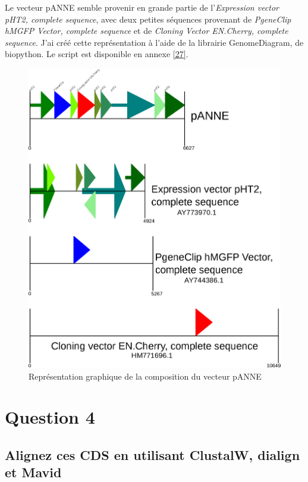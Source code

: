 \documentclass[10.9pt]{article} %
\begin{document}
Le vecteur pANNE semble provenir en grande partie de l'\emph{Expression vector pHT2, complete
sequence}, avec deux petites séquences provenant de \emph{PgeneClip hMGFP Vector, complete
sequence} et de \emph{Cloning Vector EN.Cherry, complete sequence}. J'ai créé cette représentation
à l'aide de la librairie GenomeDiagram, de biopython. Le script est disponible en annexe \ref{27}.
\begin{figure}
\includegraphics[width=\linewidth]{annexes/question_3/pANNE.eps}
\caption{Représentation graphique de la composition du vecteur pANNE}
\label{fig:first}
\end{figure}


\section{Question 4} %

\subsection[Alignement multiple]{Alignez ces CDS en utilisant ClustalW, dialign et Mavid}
\end{document}
